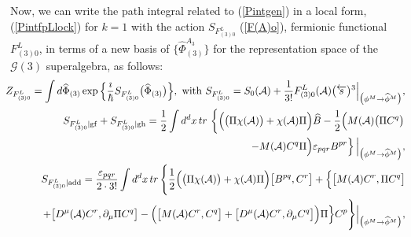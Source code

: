 \documentclass[10pt]{article}
\begin{document}
Now,
we can write the path integral related to (\ref{Pintgen}) in a local form,
 (\ref{PintfpLlock}) for $k=1$  with the action $S_{F^L_{(3)0}}$ (\ref{F(A)o}),  fermionic functional $F^L_{(3)0}$, in terms of
a new basis of $\{\widehat{\Phi}^{A_3}_{(3)}\}$  for the representation space
of the $\mathcal{G}(3) $ superalgebra, as follows:
\begin{eqnarray}
\label{PintfpLloc2f}
\hspace{-0.5em}  &\hspace{-1em}&\hspace{-0.5em} {Z}_{{F}^L_{(3)0}} =  \int  d \widehat{\Phi}_{(3)}   \exp \Big\{\frac{\imath}{\hbar}S_{F^L_{(3)0}}\big(\widehat{\Phi}_{(3)}\big)\Big\}, \ \mathrm{with}  \ S_{F^L_{(3)0}}  = S_0(\mathcal{A}) +\frac{1}{3!}%
F^L_{(3)0}(\mathcal{A}) \big(\overleftarrow{s}\big){}^3\Big|_{\big({\phi}^M \to \widehat{\phi}^M\big)}, \\
  \hspace{-0.5em}&\hspace{-1em}&\hspace{-0.5em} S_{F^L_{(3)0}|\mathrm{gf}} +  S_{F^L_{(3)0}|\mathrm{gh}}   = \frac{1}{2}\int d^d x\, tr\,     \left\{\Big(  \big(\Pi \chi(\mathcal{A})\big)+\chi(\mathcal{A})\Pi \Big)\widehat{B}     -  \frac{1}{2}\Big(  {M}(\mathcal{A}) \big(\Pi C^q \big)\right. \nonumber\\
\hspace{-0.5em}&\hspace{-0.5em}&\hspace{-0.5em}  \qquad \left.
- {M}(\mathcal{A})C^q\Pi \Big) \varepsilon_{pqr} B^{pr}\right\}\Big|_{\big({\phi}^M \to \widehat{\phi}^M\big)}, \label{Sgh3fin}\\
\hspace{-0.5em} &\hspace{-0.5em}&\hspace{-0.5em}
 S_{F^L_{(3)0}|\mathrm{add}}   =  \frac{\varepsilon_{pqr}}{2\cdot 3!}\int d^dx \,tr\, \Bigg\{\frac{1}{2}\Big(  \big(\Pi \chi(\mathcal{A})\big)+\chi(\mathcal{A})\Pi \Big)  \big[B^{pq}, C^r\big] +\Big\{   \big[{M}(\mathcal{A})C^r, \Pi C^{q}\big]
\nonumber\\
\hspace{-0.5em}&\hspace{-0.5em}&\hspace{-0.5em} \qquad
 + \big[D^\mu(\mathcal{A})C^r, \partial_\mu \Pi C^{q}\big]   -\Big(\big[{M}(\mathcal{A})C^r, C^{q}\big]+ \big[D^\mu(\mathcal{A})C^r, \partial_\mu C^{q}\big]\Big)\Pi \Big\}  C^{p}\Bigg\}\Big|_{\big({\phi}^M \to \widehat{\phi}^M\big)} ,  \label{Sadd3fin}
\end{eqnarray}
\end{document}
